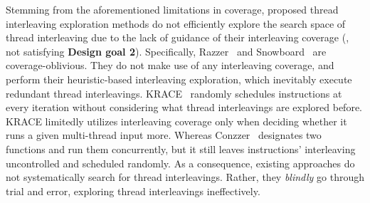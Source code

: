 







%
Stemming from the aforementioned limitations in coverage, proposed
thread interleaving exploration methods do not efficiently explore the
search space of thread interleaving due to the lack of guidance of
their interleaving coverage (\ie, not satisfying \textbf{Design goal
  2}).
%
Specifically, Razzer~\cite{razzer} and Snowboard~\cite{snowboard} are
coverage-oblivious.  They do not make use of any interleaving
coverage, and perform their heuristic-based interleaving exploration,
which inevitably execute redundant thread interleavings.
%
KRACE~\cite{krace} randomly schedules instructions at every iteration
without considering what thread interleavings are explored before.
KRACE limitedly utilizes interleaving coverage only when deciding
whether it runs a given multi-thread input more.
%
Whereas Conzzer~\cite{conzzer} designates two functions and run them
concurrently, but it still leaves instructions' interleaving
uncontrolled and scheduled randomly.
%
As a consequence, existing approaches do not systematically search for
thread interleavings.  Rather, they \textit{blindly} go through
trial and error, exploring thread interleavings ineffectively.

